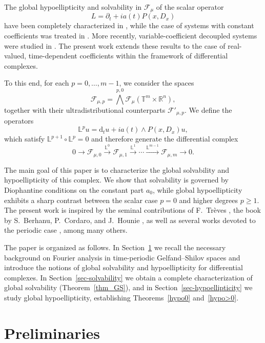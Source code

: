 \documentclass[12pt,reqno]{amsart}
\theoremstyle{definition}
\numberwithin{equation}{section}
\begin{document}
The global hypoellipticity and solvability in $\mathscr{F}_\mu$ of the scalar
operator
\[
L=\partial_t+ia(t)P(x,D_x)
\]
have been completely characterized in
\cite{AviCap22,AviCap24}, while the case of systems with constant coefficients
was treated in \cite{AviCapKir25}.
More recently, variable-coefficient decoupled systems were studied in
\cite{AviCapKir26}.
The present work extends these results to the case of real-valued,
time-dependent coefficients within the framework of differential complexes.

To this end, for each $p=0,\ldots,m-1$, we consider the spaces
\[
\mathscr{F}_{\mu,p}
=\textstyle\bigwedge^{p,0}\mathscr{F}_\mu(\mathbb{T}^m\times\mathbb{R}^n),
\]
together with their ultradistributional counterparts
$\mathscr{F}'_{\mu,p}$.
We define the operators
\[
\mathbb{L}^p u
=\mathrm{d}_t u + ia(t)\wedge P(x,D_x)u,
\]
which satisfy $\mathbb{L}^{p+1}\circ\mathbb{L}^p=0$ and therefore generate
the differential complex
\[
0\to\mathscr{F}_{\mu,0}\xrightarrow{\mathbb{L}^0}
\mathscr{F}_{\mu,1}\xrightarrow{\mathbb{L}^1}\cdots
\xrightarrow{\mathbb{L}^{m-1}}\mathscr{F}_{\mu,m}\to0.
\]

The main goal of this paper is to characterize the global solvability and hypoellipticity of this complex. We show that solvability is governed by Diophantine conditions on the constant part $a_0$, while global hypoellipticity exhibits a sharp contrast between the scalar case $p=0$ and higher degrees $p\ge 1$. The present work is inspired by the seminal contributions of F.~Tr\`eves \cite{Tre76,Treves-book}, the book by S.~Berhanu, P.~Cordaro, and J.~Hounie \cite{BerhCorHou-book}, as well as several works devoted to the periodic case \cite{BerCorMal93,BerCorPet04,BerPet99jmaa}, among many others.


The paper is organized as follows.
In Section~\ref{sec-preliminaries} we recall the necessary background on
Fourier analysis in time-periodic Gelfand--Shilov spaces and introduce the
notions of global solvability and hypoellipticity for differential
complexes.
In Section~\ref{sec-solvability} we obtain a complete characterization of
global solvability (Theorem~\ref{thm_GS}), and in
Section~\ref{sec-hypoellipticity} we study global hypoellipticity,
establishing Theorems~\ref{hypo0} and~\ref{hypo>0}.


\section{Preliminaries} \label{sec-preliminaries}
\end{document}
